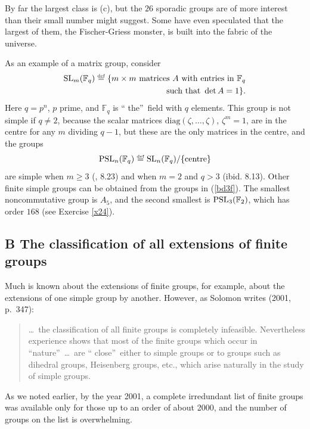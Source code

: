 \documentclass[a4paper,11pt,final]{memoir}%
\theoremstyle{nonumberplain}
\begin{document}
By far the largest class is (c), but the $26$ sporadic groups are of more
interest than their small number might suggest. Some have even speculated that
the largest of them, the Fischer-Griess monster, is built into the fabric of
the universe.

As an example of a matrix group, consider
\begin{align*}
\SL_{m}(\mathbb{F}_{q})\overset{\df}{=}\{m\times m\text{
matrices $A$ with entries in }\mathbb{F}_{q}\\
\text{ such that }\det A=1\}.
\end{align*}
Here $q=p^{n}$, $p$ prime, and $\mathbb{F}_{q}$ is \textquotedblleft
the\textquotedblright\ field with $q$ elements. This group is not simple if
$q\neq2$, because the scalar matrices $\text{diag}(\zeta,\ldots,\zeta)$,
$\zeta^{m}=1$, are in the centre for any $m$ dividing $q-1$, but these are the
only matrices in the centre, and the groups%
\[
\text{PSL}_{n}(\mathbb{F}_{q})\overset{\df}{=}\SL_{n}%
(\mathbb{F}_{q})/\{\text{centre}\}
\]
are simple when $m\geq3$ (\cite{rotman1995}, 8.23) and when $m=2$ and $q>3$
(ibid. 8.13). Other finite simple groups can be obtained from the groups in
(\ref{bd3f}). The smallest noncommutative group is $A_{5}$, and the second
smallest is $\operatorname{PSL}_{3}(\mathbb{F}{}_{2})$, which has order $168$ (see Exercise
\ref{x24}).

\subsection{B The classification of all extensions of finite groups}

Much is known about the extensions of finite groups, for example, about the
extensions of one simple group by another. However, as Solomon writes (2001, p.~347):

\begin{quote}
\ldots\ the classification of all finite groups is completely infeasible.
Nevertheless experience shows that most of the finite groups which occur in
\textquotedblleft nature\textquotedblright\ \ldots\ are \textquotedblleft
close\textquotedblright\ either to simple groups or to groups such as dihedral
groups, Heisenberg groups, etc., which arise naturally in the study of simple groups.
\end{quote}

\noindent As we noted earlier, by the year 2001, a complete irredundant list
of finite groups was available only for those up to an order of about 2000,
and the number of groups on the list is overwhelming.
\end{document}
